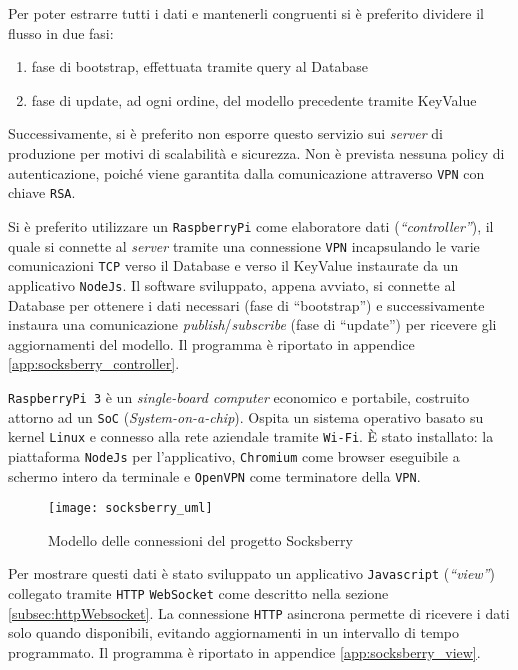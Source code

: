 Per poter estrarre tutti i dati e mantenerli congruenti si è preferito dividere il flusso in due fasi:
\begin{enumerate}
  \item fase di bootstrap, effettuata tramite query al Database
  \item fase di update, ad ogni ordine, del modello precedente tramite KeyValue
\end{enumerate}

Successivamente, si è preferito non esporre questo servizio sui \textit{server} di produzione per motivi di scalabilità e sicurezza.
Non è prevista nessuna policy di autenticazione, poiché viene garantita dalla comunicazione attraverso \verb+VPN+ con chiave \verb+RSA+.

Si è preferito utilizzare un \verb+RaspberryPi+ come elaboratore dati (\textit{``controller''}), il quale si connette al \textit{server} tramite una connessione \verb+VPN+ incapsulando le varie comunicazioni \verb+TCP+ verso il Database e verso il KeyValue instaurate da un applicativo \verb+NodeJs+.
Il software sviluppato, appena avviato, si connette al Database per ottenere i dati necessari (fase di ``bootstrap'') e successivamente instaura una comunicazione \textit{publish}/\textit{subscribe} (fase di ``update'') per ricevere gli aggiornamenti del modello.
Il programma è riportato in appendice \ref{app:socksberry_controller}.

\verb+RaspberryPi 3+ è un \textit{single-board computer} economico e portabile, costruito attorno ad un \verb+SoC+ (\textit{System-on-a-chip}).
Ospita un sistema operativo basato su kernel \verb+Linux+ e connesso alla rete aziendale tramite \verb+Wi-Fi+.
È stato installato: la piattaforma \verb+NodeJs+ per l'applicativo, \verb+Chromium+ come browser eseguibile a schermo intero da terminale e \verb+OpenVPN+ come terminatore della \verb+VPN+.

\begin{figure}[H]
  \centering
  \texttt{[image: socksberry\_uml]}
  \caption{Modello delle connessioni del progetto Socksberry}
  \label{fig:socksberryUml}
\end{figure}

Per mostrare questi dati è stato sviluppato un applicativo \verb+Javascript+ (\textit{``view''}) collegato tramite \verb+HTTP+ \verb+WebSocket+ come descritto nella sezione \ref{subsec:httpWebsocket}.
La connessione \verb+HTTP+ asincrona permette di ricevere i dati solo quando disponibili, evitando aggiornamenti in un intervallo di tempo programmato.
Il programma è riportato in appendice \ref{app:socksberry_view}.

